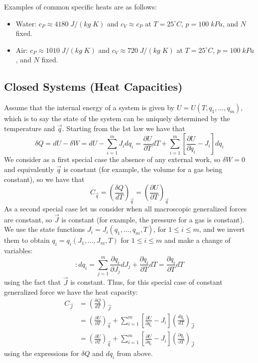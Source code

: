 \documentclass[12pt, a4paper, oneside, openright, titlepage]{book}
\begin{document}
\begin{eg}
    Examples of common specific heats are as follows: \begin{itemize}
        \item Water: $c_P \approx 4180\;J/(kg\;K)$ and $c_V \approx c_P$ at $T = 25^{\circ}C$, $p = 100\;kPa$, and $N$ fixed.
        \item Air: $c_P \approx 1010\; J/(kg\;K)$ and $c_V \approx 720\;J/(kg\;K)$ at $T = 25^{\circ}C$, $p = 100\;kPa$, and $N$ fixed.
    \end{itemize}
\end{eg}

\subsection{Closed Systems (Heat Capacities)}

Assume that the internal energy of a system is given by $U = U(T,q_1,...,q_m)$, which is to say the state of the system can be uniquely determined by the temperature and $\vec{q}$. Starting from the 1st law we have that \begin{equation*}
    \delta Q = dU - \delta W = dU - \sum_{i=1}^mJ_idq_i = \frac{\partial U}{\partial T}dT + \sum_{i=1}^m\left[\frac{\partial U}{\partial q_i} - J_i\right]dq_i
\end{equation*}
We consider as a first special case the absence of any external work, so $\delta W = 0$ and equivalently $\vec{q}$ is constant (for example, the volume for a gas being constant), so we have that \begin{equation*}
    C_{\vec{q}} = \left(\frac{\delta Q}{dT}\right)_{\vec{q}} = \left(\frac{\partial U}{\partial T}\right)_{\vec{q}}
\end{equation*}
As a second special case let us consider when all macroscopic generalized forces are constant, so $\vec{J}$ is constant (for example, the pressure for a gas is constant). We use the state functions $J_i=J_i(q_1,...,q_m,T)$, for $1 \leq i \leq m$, and we invert them to obtain $q_i = q_i(J_1,...,J_m,T)$ for $1 \leq i \leq m$ and make a change of variables: \begin{equation*}:
    dq_i = \sum_{j=1}^m\frac{\partial q_i}{\partial J_j}dJ_j + \frac{\partial q_i}{\partial T}dT = \frac{\partial q_i}{\partial T}dT
\end{equation*}
using the fact that $\vec{J}$ is constant. Thus, for this special case of constant generalized force we have the heat capacity: \begin{align*}
    C_{\vec{J}} &= \left(\frac{\delta Q}{dT}\right)_{\vec{J}} \\
    &= \left(\frac{\partial U}{\partial T}\right)_{\vec{q}} + \sum_{i=1}^m\left[\frac{\partial U}{\partial q_i} - J_i\right]\left(\frac{dq_i}{dT}\right)_{\vec{J}} \\
    &= \left(\frac{\partial U}{\partial T}\right)_{\vec{q}} + \sum_{i=1}^m\left[\frac{\partial U}{\partial q_i} - J_i\right]\left(\frac{\partial q_i}{\partial T}\right)_{\vec{J}} 
\end{align*}
using the expressions for $\delta Q$ and $dq_i$ from above.
\end{document}
